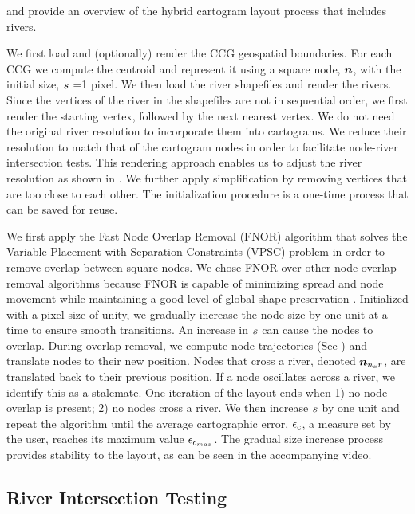  and  provide an overview of the hybrid cartogram layout process that includes rivers.

 We first load and (optionally) render the CCG geospatial boundaries. For each CCG we compute the centroid and represent it using a square node, $ \bm{n} $, with the initial size, $ s $ =1 pixel. We then load the river shapefiles and render the rivers. Since the vertices of the river in the shapefiles are not in sequential order, we first render the starting vertex, followed by the next nearest vertex. We do not need the original river resolution to incorporate them into cartograms. We reduce their resolution to match that of the cartogram nodes in order to facilitate node-river intersection tests. This rendering approach enables us to adjust the river resolution as shown in . We further apply simplification by removing vertices that are too close to each other. The initialization procedure is a one-time process that can be saved for reuse.


 We first apply the Fast Node Overlap Removal (FNOR) algorithm that solves the Variable Placement with Separation Constraints (VPSC) problem \cite{dwyer2006Fast} in order to remove overlap between square nodes. We chose FNOR over other node overlap removal algorithms because FNOR is capable of minimizing spread and node movement while maintaining a good level of global shape preservation \cite{chen2020Node}. Initialized with a pixel size of unity, we gradually increase the node size by one unit at a time to ensure smooth transitions. An increase in $ s $ can cause the nodes to overlap. During overlap removal, we compute node trajectories (See ) and translate nodes to their new position. Nodes that cross a river, denoted $ \bm{n}_{n_{x}r} $, are translated back to their previous position. If a node oscillates across a river, we identify this as a stalemate. One iteration of the layout ends when 1) no node overlap is present; 2) no nodes cross a river. We then increase $ s $ by one unit and repeat the algorithm until the average cartographic error, $ \epsilon_{c} $, a measure set by the user, reaches its maximum value $ \epsilon_{c_{max}} $. The gradual size increase process provides stability to the layout, as can be seen in the accompanying video.

\subsection{River Intersection Testing}

